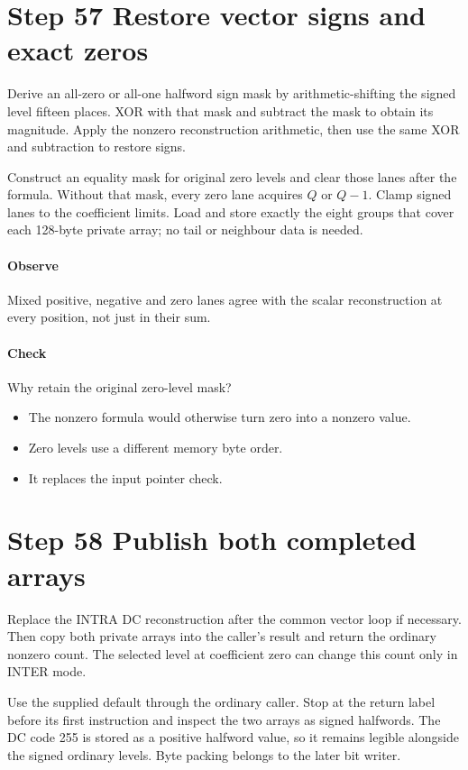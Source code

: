 \section{Step 57 Restore vector signs and exact zeros}\label{h263-quant-s07}
Derive an all-zero or all-one halfword sign mask by arithmetic-shifting the signed
level fifteen places. XOR with that mask and subtract the mask to obtain its
magnitude. Apply the nonzero reconstruction arithmetic, then use the same XOR
and subtraction to restore signs.

Construct an equality mask for original zero levels and clear those lanes after
the formula. Without that mask, every zero lane acquires $Q$ or $Q-1$. Clamp
signed lanes to the coefficient limits. Load and store exactly the eight groups
that cover each 128-byte private array; no tail or neighbour data is needed.

\paragraph{Observe} Mixed positive, negative and zero lanes agree with the
scalar reconstruction at every position, not just in their sum.
\paragraph{Check} Why retain the original zero-level mask?
\begin{itemize}
  \item[A.] The nonzero formula would otherwise turn zero into a nonzero value.
  \item[B.] Zero levels use a different memory byte order.
  \item[C.] It replaces the input pointer check.
\end{itemize}

\section{Step 58 Publish both completed arrays}\label{h263-quant-s08}
Replace the INTRA DC reconstruction after the common vector loop if necessary.
Then copy both private arrays into the caller's result and return the ordinary
nonzero count. The selected level at coefficient zero can change this count only
in INTER mode.

Use the supplied default through the ordinary caller. Stop at the return label
before its first instruction and inspect the two arrays as signed halfwords.
The DC code 255 is stored as a positive halfword value, so it remains legible
alongside the signed ordinary levels. Byte packing belongs to the later bit writer.


